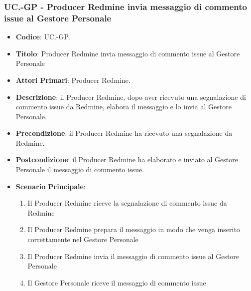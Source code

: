 	\subsubsection{UC\theuccount.\thesubuccount-GP - Producer Redmine invia messaggio di commento issue al Gestore Personale}
	\begin{itemize}
		\item \textbf{Codice}: UC\theuccount.\thesubuccount-GP.
		\item \textbf{Titolo}: Producer Redmine invia messaggio di commento issue al Gestore Personale
		\item \textbf{Attori Primari}: Producer Redmine.
		\item \textbf{Descrizione}: il Producer Redmine, dopo aver ricevuto una segnalazione di commento issue da Redmine, elabora il messaggio e lo invia al Gestore Personale.
		\item \textbf{Precondizione}: il Producer Redmine ha ricevuto una segnalazione da Redmine.
		\item \textbf{Postcondizione}: il Producer Redmine ha elaborato e inviato al Gestore Personale il messaggio di commento issue.
		\item \textbf{Scenario Principale}:
		\begin{enumerate}
			\item Il Producer Redmine riceve la segnalazione di commento issue da Redmine
			\item Il Producer Redmine prepara il messaggio in modo che venga inserito correttamente nel Gestore Personale
			\item Il Producer Redmine invia il messaggio di	commento issue al Gestore Personale
			\item Il Gestore Personale riceve il messaggio di commento issue
		\end{enumerate}
	\end{itemize}
